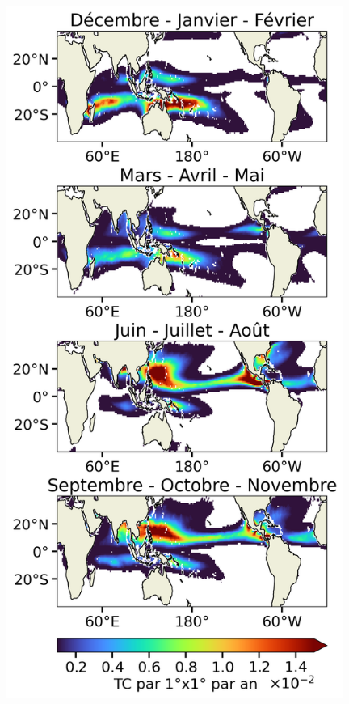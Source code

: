 \documentclass[aspectratio=169, usepdftitle=false, xcolor={dvipsnames}, 9pt,table]{beamer}
\begin{document}
\begin{frame}[t]
\begin{columns}
\begin{column}{0.3\textwidth}
\begin{figure}
                \includegraphics[width=0.98\textwidth]{Figures/acgi_seasonal_turbo.png}
            \end{figure}
        \end{column}
    \end{columns}
\end{frame}
\end{document}
